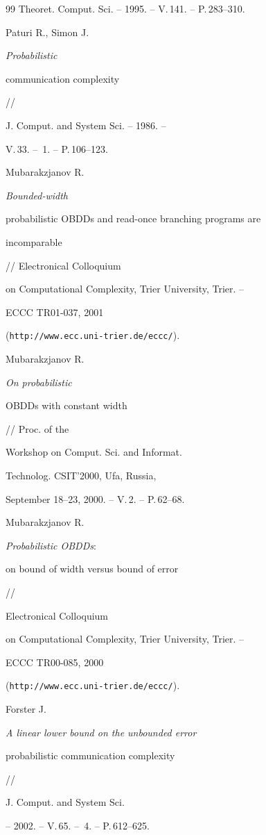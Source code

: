 \begin{thebibliography}{99}
Theoret. Comput. Sci. -- 1995. -- V.\,141. -- P.\,283--310.




Paturi R., Simon J. {\em Probabilistic


communication complexity} //


J. Comput. and System Sci. -- 1986. --


V.\,33. -- \No\,1. -- P.\,106--123.




Mubarakzjanov R. {\em Bounded-width


probabilistic OBDDs and read-once branching programs are


incomparable} // Electronical Colloquium


on Computational Complexity, Trier University, Trier. --


ECCC TR01-037, 2001


({\tt http://www.ecc.uni-trier.de/eccc/}).




Mubarakzjanov R. {\em On probabilistic


OBDDs with constant width} // Proc. of the


Workshop on Comput. Sci. and Informat.


Technolog. CSIT'2000, Ufa, Russia,


September 18--23, 2000. -- V.\,2. -- P.\,62--68.




Mubarakzjanov R. {\em Probabilistic OBDDs\/${:}$


on bound of width versus bound of error} //


Electronical Colloquium


on Computational Complexity, Trier University, Trier. --


ECCC TR00-085, 2000


({\tt http://www.ecc.uni-trier.de/eccc/}).




Forster J. {\em A linear lower bound on the unbounded error


probabilistic communication complexity} //


J. Comput. and System Sci.


-- 2002. -- V.\,65. -- \No\,4. -- P.\,612--625.





\end{thebibliography}





\vskip 2cm












\label{end}











